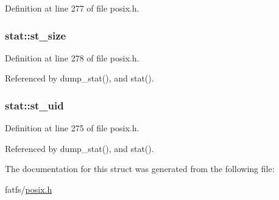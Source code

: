 Definition at line 277 of file posix.\-h.

\hypertarget{structstat_a040e19c8b9766f841fde8786ce9297bf}{
\subsubsection[{st\-\_\-size}]{ stat\-::st\-\_\-size}}\label{structstat_a040e19c8b9766f841fde8786ce9297bf}


Definition at line 278 of file posix.\-h.



Referenced by dump\-\_\-stat(), and stat().

\hypertarget{structstat_a4a8708a3d18be60ee7b2f06c4cab0c70}{
\subsubsection[{st\-\_\-uid}]{ stat\-::st\-\_\-uid}}\label{structstat_a4a8708a3d18be60ee7b2f06c4cab0c70}


Definition at line 275 of file posix.\-h.



Referenced by dump\-\_\-stat(), and stat().



The documentation for this struct was generated from the following file\-:\begin{DoxyCompactItemize}
\item 
fatfs/\hyperlink{posix_8h}{posix.\-h}\end{DoxyCompactItemize}
